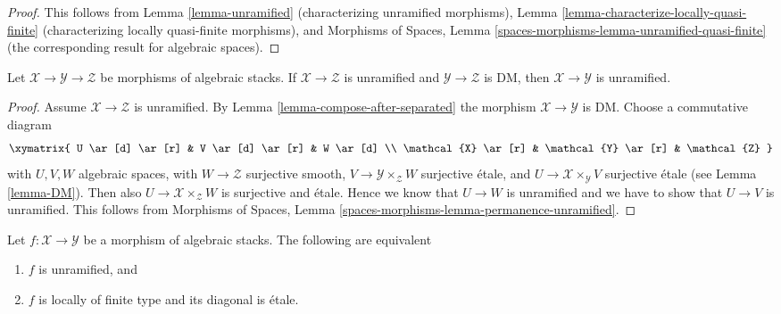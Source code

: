 \begin{proof}
This follows from
Lemma \ref{lemma-unramified} (characterizing unramified morphisms),
Lemma \ref{lemma-characterize-locally-quasi-finite} (characterizing
locally quasi-finite morphisms), and
Morphisms of Spaces, Lemma
\ref{spaces-morphisms-lemma-unramified-quasi-finite} (the corresponding
result for algebraic spaces).
\end{proof}

\begin{lemma}
\label{lemma-permanence-unramified}
Let $\mathcal{X} \to \mathcal{Y} \to \mathcal{Z}$ be
morphisms of algebraic stacks.
If $\mathcal{X} \to \mathcal{Z}$ is unramified and
$\mathcal{Y} \to \mathcal{Z}$ is DM, then
$\mathcal{X} \to \mathcal{Y}$ is unramified.
\end{lemma}

\begin{proof}
Assume $\mathcal{X} \to \mathcal{Z}$ is unramified. By
Lemma \ref{lemma-compose-after-separated} the morphism
$\mathcal{X} \to \mathcal{Y}$ is DM. Choose a commutative diagram
$$
\xymatrix{
U \ar[d] \ar[r] & V \ar[d] \ar[r] & W \ar[d] \\
\mathcal{X} \ar[r] & \mathcal{Y} \ar[r] & \mathcal{Z}
}
$$
with $U, V, W$ algebraic spaces,
with $W \to \mathcal{Z}$ surjective smooth,
$V \to \mathcal{Y} \times_\mathcal{Z} W$ surjective \'etale, and
$U \to \mathcal{X} \times_\mathcal{Y} V$ surjective \'etale
(see Lemma \ref{lemma-DM}). Then also
$U \to \mathcal{X} \times_\mathcal{Z} W$ is surjective and \'etale.
Hence we know that $U \to W$ is unramified and we have to show that
$U \to V$ is unramified. This follows from
Morphisms of Spaces, Lemma \ref{spaces-morphisms-lemma-permanence-unramified}.
\end{proof}

\begin{lemma}
\label{lemma-characterize-unramified}
Let $f : \mathcal{X} \to \mathcal{Y}$ be a morphism of algebraic stacks.
The following are equivalent
\begin{enumerate}
\item $f$ is unramified, and
\item $f$ is locally of finite type and its diagonal is \'etale.
\end{enumerate}
\end{lemma}

